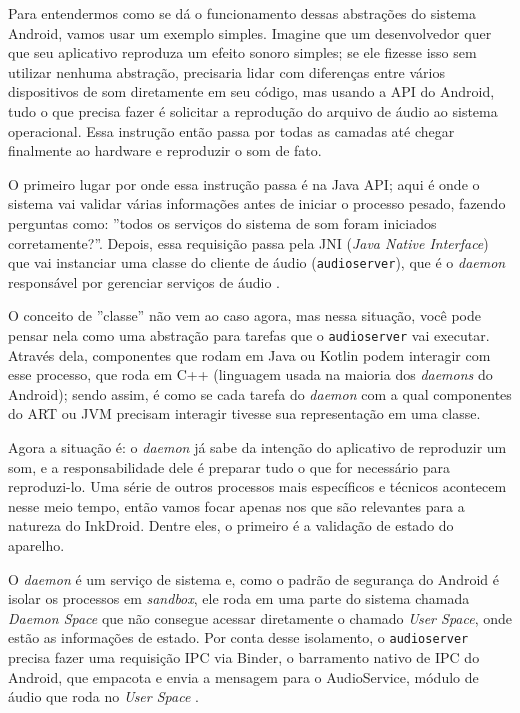 \documentclass[
    12pt,
    openright,
    oneside,
    a4paper,
    english,
    brazilian
    ]{abntex2}
\begin{document}
Para entendermos como se dá o funcionamento dessas abstrações do sistema Android, vamos usar um exemplo simples. Imagine que um desenvolvedor quer que seu aplicativo reproduza um efeito sonoro simples; se ele fizesse isso sem utilizar nenhuma abstração, precisaria lidar com diferenças entre vários dispositivos de som diretamente em seu código, mas usando a API do Android, tudo o que precisa fazer é solicitar a reprodução do arquivo de áudio ao sistema operacional. Essa instrução então passa por todas as camadas até chegar finalmente ao hardware e reproduzir o som de fato.

O primeiro lugar por onde essa instrução passa é na Java API; aqui é onde o sistema vai validar várias informações antes de iniciar o processo pesado, fazendo perguntas como: ''todos os serviços do sistema de som foram iniciados corretamente?''. Depois, essa requisição passa pela JNI (\textit{Java Native Interface}) que vai instanciar uma classe do cliente de áudio (\texttt{audioserver}), que é o \textit{daemon} responsável por gerenciar serviços de áudio \cite{android2025, aosp2024}.

O conceito de ''classe'' não vem ao caso agora, mas nessa situação, você pode pensar nela como uma abstração para tarefas que o \texttt{audioserver} vai executar. Através dela, componentes que rodam em Java ou Kotlin podem interagir com esse processo, que roda em C++ (linguagem usada na maioria dos \textit{daemons} do Android); sendo assim, é como se cada tarefa do \textit{daemon} com a qual componentes do ART ou JVM precisam interagir tivesse sua representação em uma classe.

Agora a situação é: o \textit{daemon} já sabe da intenção do aplicativo de reproduzir um som, e a responsabilidade dele é preparar tudo o que for necessário para reproduzi-lo. Uma série de outros processos mais específicos e técnicos acontecem nesse meio tempo, então vamos focar apenas nos que são relevantes para a natureza do InkDroid. Dentre eles, o primeiro é a validação de estado do aparelho.

O \textit{daemon} é um serviço de sistema e, como o padrão de segurança do Android é isolar os processos em \textit{sandbox}, ele roda em uma parte do sistema chamada \textit{Daemon Space} que não consegue acessar diretamente o chamado \textit{User Space}, onde estão as informações de estado. Por conta desse isolamento, o \texttt{audioserver} precisa fazer uma requisição IPC via Binder, o barramento nativo de IPC do Android, que empacota e envia a mensagem para o AudioService, módulo de áudio que roda no \textit{User Space} \cite{aosp2024}.
\end{document}
